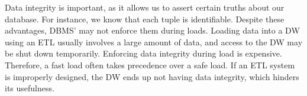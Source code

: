 Data integrity is important, as it allows us to assert certain truths about our database. For instance, we know that each tuple is identifiable. Despite these advantages, DBMS' may not enforce them during loads. Loading data into a DW using an ETL usually involves a large amount of data, and access to the DW may be shut down temporarily. Enforcing data integrity during load is expensive. Therefore, a fast load often takes precedence over a safe load. If an ETL system is improperly designed, the DW ends up not having data integrity, which hinders its usefulness.